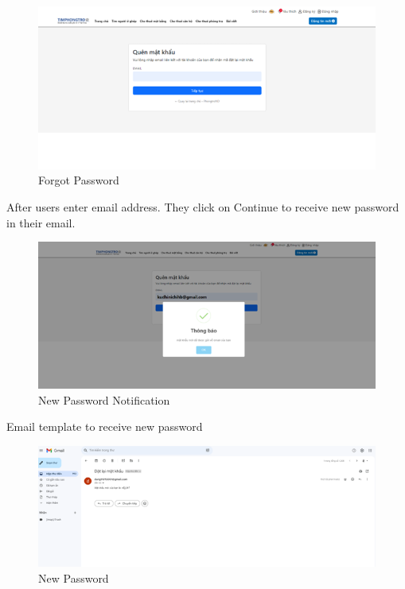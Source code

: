 \documentclass[../Main.tex]{subfiles}
\begin{document}
\begin{figure}[H]
    \centering
    \includegraphics[width=\textwidth]{Figure/Picture31.png}
    \caption{Forgot Password}
\end{figure}

After users enter email address.
They click on Continue to receive new password in their email.

\begin{figure}[H]
    \centering
    \includegraphics[width=\textwidth]{Figure/Picture32.png}
    \caption{New Password Notification}
\end{figure}

Email template to receive new password

\begin{figure}[H]
    \centering
    \includegraphics[width=\textwidth]{Figure/Picture33.png}
    \caption{New Password}
\end{figure}
\end{document}
